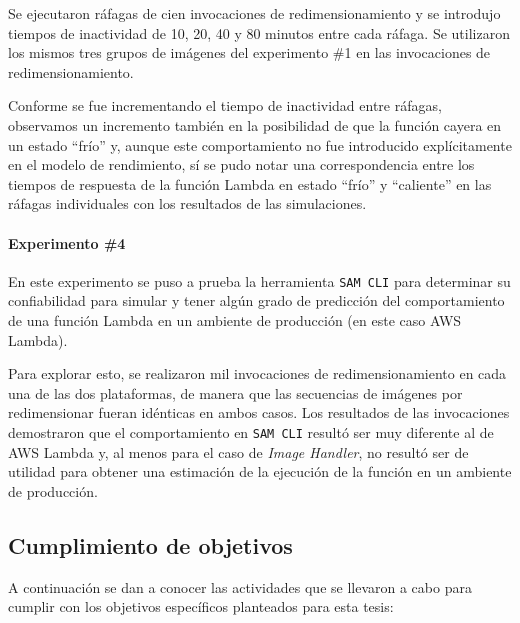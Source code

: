 Se ejecutaron ráfagas de cien invocaciones de redimensionamiento y se introdujo tiempos de inactividad de 10, 20, 40 y 80 minutos entre cada ráfaga. Se utilizaron los mismos tres grupos de imágenes del experimento \#1 en las invocaciones de redimensionamiento.

Conforme se fue incrementando el tiempo de inactividad entre ráfagas, observamos un incremento también en la posibilidad de que la función cayera en un estado ``frío'' y, aunque este comportamiento no fue introducido explícitamente en el modelo de rendimiento, sí se pudo notar una correspondencia entre los tiempos de respuesta de la función Lambda en estado ``frío'' y ``caliente'' en las ráfagas individuales con los resultados de las simulaciones.

\paragraph{Experimento \#4} En este experimento se puso a prueba la herramienta \texttt{SAM CLI} para determinar su confiabilidad para simular y tener algún grado de predicción del comportamiento de una función Lambda en un ambiente de producción (en este caso AWS Lambda). 

Para explorar esto, se realizaron mil invocaciones de redimensionamiento en cada una de las dos plataformas, de manera que las secuencias de imágenes por redimensionar fueran idénticas en ambos casos. Los resultados de las invocaciones demostraron que el comportamiento en \texttt{SAM CLI} resultó ser muy diferente al de AWS Lambda y, al menos para el caso de \emph{Image Handler}, no resultó ser de utilidad para obtener una estimación de la ejecución de la función en un ambiente de producción.

\subsection{Cumplimiento de objetivos}
A continuación se dan a conocer las actividades que se llevaron a cabo para cumplir con los objetivos específicos planteados para esta tesis:


